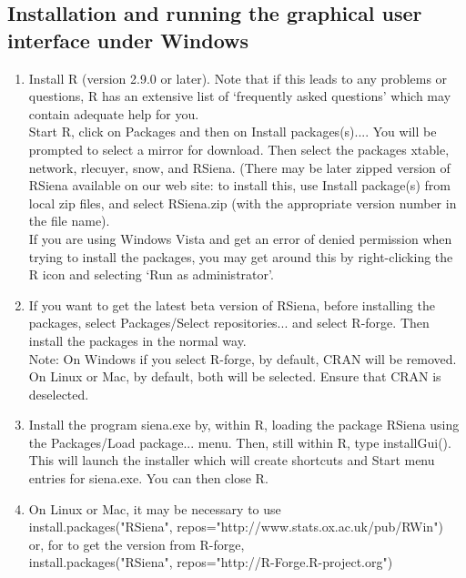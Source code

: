 \documentclass[a4paper,fleqn]{article}
\newcommand{\+}{\, + \,}
\newcommand{\sfn}[1]{\textsf{#1}}
\newcommand{\R}{{\sf R }}
\newcommand{\Rn}{{\sf R}}
\newcommand{\rs}{{\sf RSiena}}
\newcommand{\RS}{{\sf RSiena }}
\begin{document}
\subsection{Installation and running the graphical user interface under Windows}
\label{Gui}
\begin{enumerate}
\item %
  Install \R (version 2.9.0 or later). Note that if this leads to any
  problems or questions, \R has an extensive list of `frequently asked
  questions' which may contain adequate help for you.\\
  Start \Rn, click on \sfn{Packages} and
  then on \sfn{Install packages(s)...}. You will be prompted to select a mirror
  for download. Then select the packages \sfn{xtable},
  \sfn{network}, \sfn{rlecuyer}, \sfn{snow},
  and \rs. (There may be later zipped version of \RS available on our web
  site: to install this, use \sfn{Install package(s) from local zip files}, and
  select \sfn{RSiena.zip} (with the appropriate version number in the file
  name).\\
  If you are using Windows Vista and get an error of denied permission
  when trying to install the packages,
  you may get around this by right-clicking the \R icon and selecting
  `Run as administrator'.
\item If you want to get the latest beta version of \rs, before installing the
  packages, select \sfn{Packages/Select repositories...} and select
  \sfn{R-forge}. Then install the packages in the normal way. \\
  Note: On Windows if
  you select \sfn{R-forge}, by default, \sfn{CRAN} will be removed. On Linux or
  Mac, by default, both will be selected. Ensure that \sfn{CRAN} is deselected.
\item Install the program \sfn{siena.exe} by, within \Rn, loading the package
  RSiena using the \sfn{Packages/Load package...} menu. Then, still within \Rn,
  type \sfn{installGui()}. This will launch the installer which will create
  shortcuts and Start menu entries for \sfn{siena.exe}. You can then close \Rn.
\item On Linux or Mac, it may be necessary to use \\
 \sfn{install.packages("RSiena", repos="http://www.stats.ox.ac.uk/pub/RWin")}\\
or, for to get the version from \sfn{R-forge}, \\
 \sfn{install.packages("RSiena", repos="http://R-Forge.R-project.org")}



\end{enumerate}
\end{document}
